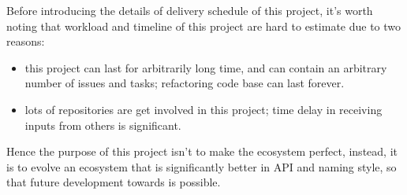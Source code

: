 Before introducing the details of delivery schedule of this project, it's worth noting that workload and timeline of this project are hard to estimate due to two reasons:
\begin{itemize}
    \item this project can last for arbitrarily long time, and can contain an arbitrary number of issues and tasks; refactoring code base can last forever.
    \item lots of repositories are get involved in this project; time delay in receiving inputs from others is significant.
\end{itemize}
Hence the purpose of this project isn't to make the ecosystem perfect, instead, it is to evolve an ecosystem that is significantly better in API and naming style, so that future development towards \images{}  is possible.

